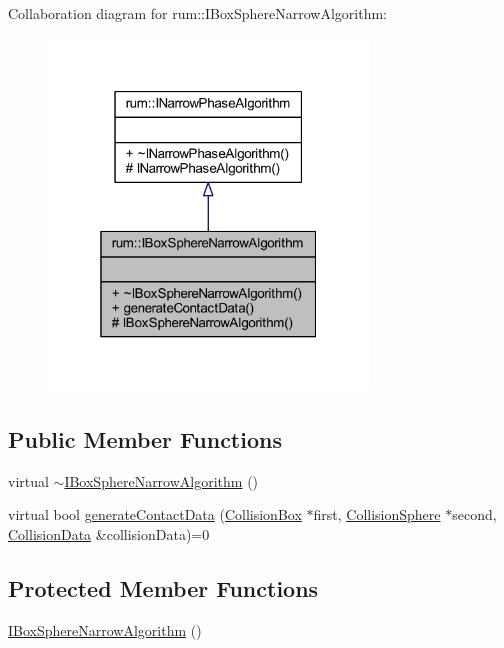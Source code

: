 Collaboration diagram for rum\+:\+:I\+Box\+Sphere\+Narrow\+Algorithm\+:\nopagebreak
\begin{figure}[H]
\begin{center}
\leavevmode
\includegraphics[width=241pt]{classrum_1_1_i_box_sphere_narrow_algorithm__coll__graph}
\end{center}
\end{figure}
\subsection*{Public Member Functions}
\begin{DoxyCompactItemize}
\item 
virtual \mbox{\hyperlink{classrum_1_1_i_box_sphere_narrow_algorithm_afb087dc28631e7d625d0cc36c8a37385}{$\sim$\+I\+Box\+Sphere\+Narrow\+Algorithm}} ()
\item 
virtual bool \mbox{\hyperlink{classrum_1_1_i_box_sphere_narrow_algorithm_a4b32bfe38ae668e68b5f6c400cf03e78}{generate\+Contact\+Data}} (\mbox{\hyperlink{classrum_1_1_collision_box}{Collision\+Box}} $\ast$first, \mbox{\hyperlink{classrum_1_1_collision_sphere}{Collision\+Sphere}} $\ast$second, \mbox{\hyperlink{classrum_1_1_collision_data}{Collision\+Data}} \&collision\+Data)=0
\end{DoxyCompactItemize}
\subsection*{Protected Member Functions}
\begin{DoxyCompactItemize}
\item 
\mbox{\hyperlink{classrum_1_1_i_box_sphere_narrow_algorithm_ac0fd1b844c261bfef20fd0d8bef7d766}{I\+Box\+Sphere\+Narrow\+Algorithm}} ()
\end{DoxyCompactItemize}


